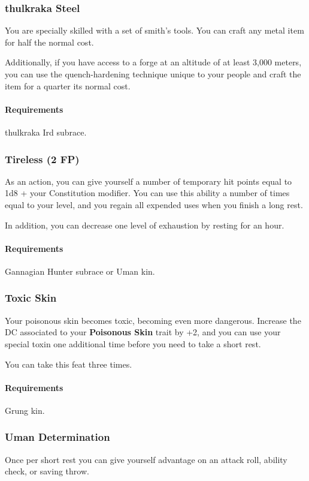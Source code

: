 \subsubsection{thulkraka Steel} \label{feat::thulkrakasteel}
    You are specially skilled with a set of smith's tools.
    You can craft any metal item for half the normal cost.

    Additionally, if you have access to a forge at an altitude of at least 3,000 meters, you can use the quench-hardening technique unique to your people and craft the item for a quarter its normal cost.
    \paragraph{Requirements} thulkraka Ird subrace.
\subsubsection{Tireless (2 FP)} \label{feat::tireless}
    As an action, you can give yourself a number of temporary hit points equal to 1d8 + your Constitution modifier.
    You can use this ability a number of times equal to your level, and you regain all expended uses when you finish a long rest.

    In addition, you can decrease one level of exhaustion by resting for an hour.
    \paragraph{Requirements} Gannagian Hunter subrace or Uman kin.
\subsubsection{Toxic Skin} \label{feat::toxicskin}
    Your poisonous skin becomes toxic, becoming even more dangerous.
    Increase the DC associated to your \textbf{Poisonous Skin} trait by +2, and you can use your special toxin one additional time before you need to take a short rest.

    You can take this feat three times.
    \paragraph{Requirements} Grung kin.
\subsubsection{Uman Determination} \label{feat::umandetermination}
    Once per short rest you can give yourself advantage on an attack roll, ability check, or saving throw.

